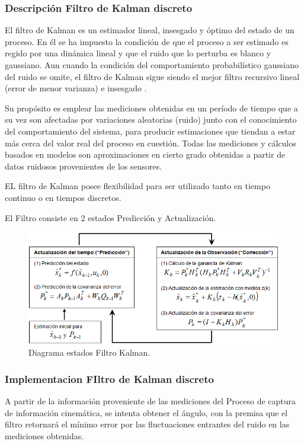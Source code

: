 \documentclass[12pt,a4paper]{article}
\begin{document}
\subsubsection{Descripción Filtro de Kalman discreto}
El filtro de Kalman es un estimador lineal, insesgado y óptimo del estado de un proceso. En él se ha impuesto la condición de que el proceso a ser estimado es regido por una dinámica lineal y que el ruido que lo perturba es blanco y gaussiano. Aun cuando la condición del comportamiento probabilístico gaussiano del ruido se omite, el filtro de Kalman sigue siendo el mejor filtro recursivo lineal (error de menor varianza) e insesgado \cite{TesisUSM}.

Su propósito es emplear las mediciones obtenidas en un período de tiempo que a su vez son afectadas por variaciones  aleatorias (ruido) junto con el conocimiento del comportamiento del sistema, para producir estimaciones que tiendan a estar más cerca del valor real del proceso en cuestión. Todas las mediciones y cálculos basados en modelos son aproximaciones en cierto grado obtenidas a partir de datos ruidosos provenientes de los sensores.

EL filtro de Kalman posee flexibilidad para ser utilizado tanto en tiempo continuo o en tiempos discretos.

El Filtro consiste en 2 estados Predicción y Actualización.

\begin{figure}[H]
	\centering
	\includegraphics[scale=0.65]{images/kalman-filter.png} 
	\caption{Diagrama estados Filtro Kalman.}
	\label{fig:diagramakalman}
\end{figure}

\subsubsection{Implementacion FIltro de Kalman discreto}
A partir de la información proveniente de las mediciones del Proceso de captura de información cinemática, se intenta obtener el ángulo, con la premisa que el filtro retornará el mínimo error por las fluctuaciones entrantes del ruido en las mediciones obtenidas.
\end{document}
